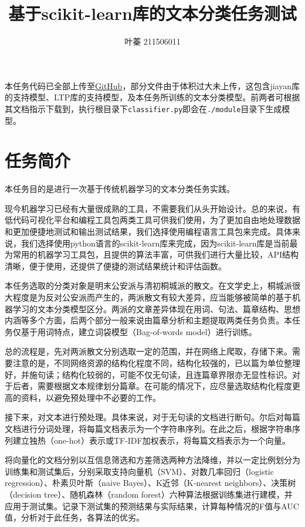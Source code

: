 \documentclass[12pt, a4paper, oneside]{ctexart}
\title{基于scikit-learn库的文本分类任务测试}
\author{叶蓁 211506011}
\date{}
\begin{document}
\maketitle

本任务代码已全部上传至\href{https://github.com/Bobo-alcazar/classification-of-essays-in-Gongan-and-Torngcherng}{GitHub}，部分文件由于体积过大未上传，这包含jiayan库的支持模型、LTP库的支持模型，及本任务所训练的文本分类模型。前两者可根据其文档指示下载到，执行根目录下\verb!classifier.py!即会在\verb!./module!目录下生成模型。

\section{任务简介}

本任务目的是进行一次基于传统机器学习的文本分类任务实践。

现今机器学习已经有大量很成熟的工具，不需要我们从头开始设计。总的来说，有低代码可视化平台和编程工具包两类工具可供我们使用，为了更加自由地处理数据和更加便捷地测试和输出测试结果，我们选择使用编程语言工具包来完成。具体来说，我们选择使用python语言的scikit-learn库来完成，因为scikit-learn库是当前最为常用的机器学习工具包，且提供的算法丰富，可供我们进行大量比较，API结构清晰，便于使用，还提供了便捷的测试结果统计和评估函数。

本任务选取的分类对象是明末公安派与清初桐城派的散文。在文学史上，桐城派很大程度是为反对公安派而产生的，两派散文有较大差异，应当能够被简单的基于机器学习的文本分类模型区分。两派的文章差异体现在用词、句法、篇章结构、思想内涵等多个方面，后两个部分一般来说由篇章分析和主题提取两类任务负责。本任务仅基于用词特点，建立词袋模型（Bag-of-words model）进行训练。

总的流程是，先对两派散文分别选取一定的范围，并在网络上爬取，存储下来。需要注意的是，不同网络资源的结构化程度不同，结构化较强的，已以篇为单位整理好，并施句读；结构化较弱的，可能不仅无句读，且连篇章界限亦无显性标识。对于后者，需要根据文本规律划分篇章。在可能的情况下，应尽量选取结构化程度更高的资料，以避免预处理中不必要的工作。

接下来，对文本进行预处理。具体来说，对于无句读的文档进行断句。尔后对每篇文档进行分词处理，将每篇文档表示为一个字符串序列。在此之后，根据字符串序列建立独热（one-hot）表示或TF-IDF加权表示，将每篇文档表示为一个向量。

将向量化的文档分别以互信息筛选和方差筛选两种方法降维，并以一定比例划分为训练集和测试集后，分别采取支持向量机（SVM）、对数几率回归（logistic regression）、朴素贝叶斯（naive Bayes）、K近邻（K-nearest neighbors）、决策树（decision tree）、随机森林（random forest）六种算法根据训练集进行建模，并应用于测试集。记录下测试集的预测结果与实际结果，计算每种情况的F值与AUC值，分析对于此任务，各算法的优劣。
\end{document}

